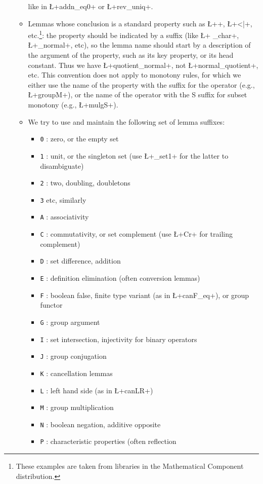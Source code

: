 \begin{itemize}
\begin{itemize}
    like in \L+addn_eq0+ or \L+rev_uniq+.
  \item Lemmas whose conclusion is a standard property such as
    \L+\char+, \L+<|+, etc.\footnote{These examples are taken from
      libraries in the Mathematical Component distribution.}:
    the property should be
    indicated by a suffix (like \L+ _char+, \L+_normal+, etc), so
    the lemma name
    should start by a description of the argument of the property, such as
    its key property, or its head constant.
    Thus we have \L+quotient_normal+, not \L+normal_quotient+, etc. This
    convention does not apply to monotony rules, for which we either
    use the name of the property with the suffix for the operator
    (e.g., \L+groupM+), or the name of the operator with the S
    suffix for subset monotony (e.g., \L+mulgS+).
  \item We try to use and maintain the following set of lemma suffixes:
    \begin{itemize}
    \item {\tt 0} : zero, or the empty set
    \item {\tt 1} : unit, or the singleton set (use \L+_set1+ for
      the latter to disambiguate)
    \item {\tt 2} : two, doubling, doubletons
    \item {\tt 3} etc, similarly
    \item {\tt A} : associativity
    \item {\tt C} : commutativity, or set complement (use \L+Cr+
      for trailing complement)
    \item {\tt D} : set difference, addition
    \item {\tt E} : definition elimination (often conversion
      lemmas)
    \item {\tt F} : boolean false, finite type variant (as in
      \L+canF_eq+), or group functor
    \item {\tt G} : group argument
    \item {\tt I} : set intersection, injectivity for binary operators
    \item {\tt J} : group conjugation
    \item {\tt K} : cancellation lemmas
    \item {\tt L} : left hand side (as in \L+canLR+)
    \item {\tt M} : group multiplication
    \item {\tt N} : boolean negation, additive opposite
    \item {\tt P} : characteristic properties (often reflection

\end{itemize}
\end{itemize}
\end{itemize}

